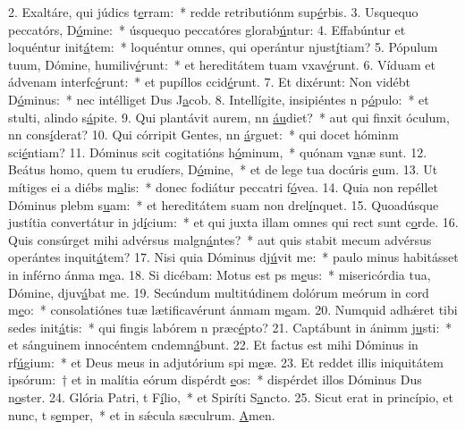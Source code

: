 2. Exaltáre, qui júdics t\uline{e}rram:~* redde retributiónm sup\uline{é}rbis.
3. Usquequo peccatórs, D\uline{ó}mine:~* úsquequo peccatóres glorab\uline{ú}ntur:
4. Effabúntur et loquéntur init\uline{á}tem:~* loquéntur omnes, qui operántur njust\uline{í}tiam?
5. Pópulum tuum, Dómine, humiliv\uline{é}runt:~* et hereditátem tuam vxav\uline{é}runt.
6. Víduam et ádvenam interfc\uline{é}runt:~* et pupíllos ccid\uline{é}runt.
7. Et dixérunt: Non vidébt D\uline{ó}minus:~* nec intélliget Dus J\uline{a}cob.
8. Intellígite, insipiéntes n p\uline{ó}pulo:~* et stulti, alindo s\uline{á}pite.
9. Qui plantávit aurem, nn \uline{áu}diet?~* aut qui finxit óculum, nn cons\uline{í}derat?
10. Qui córripit Gentes, nn \uline{á}rguet:~* qui docet hóminm sci\uline{é}ntiam?
11. Dóminus scit cogitatións h\uline{ó}minum,~* quónam v\uline{a}næ sunt.
12. Beátus homo, quem tu erudíers, D\uline{ó}mine,~* et de lege tua docúris \uline{e}um.
13. Ut mítiges ei a diébs m\uline{a}lis:~* donec fodiátur peccatri f\uline{ó}vea.
14. Quia non repéllet Dóminus plebm s\uline{u}am:~* et hereditátem suam non drel\uline{í}nquet.
15. Quoadúsque justítia convertátur in jd\uline{í}cium:~* et qui juxta illam omnes qui rect sunt c\uline{o}rde.
16. Quis consúrget mihi advérsus malgn\uline{á}ntes?~* aut quis stabit mecum advérsus operántes inquit\uline{á}tem?
17. Nisi quia Dóminus dj\uline{ú}vit me:~* paulo minus habitásset in inférno ánma m\uline{e}a.
18. Si dicébam: Motus est ps m\uline{e}us:~* misericórdia tua, Dómine, djuv\uline{á}bat me.
19. Secúndum multitúdinem dolórum meórum in cord m\uline{e}o:~* consolatiónes tuæ lætificavérunt ánmam m\uline{e}am.
20. Numquid adhǽret tibi sedes init\uline{á}tis:~* qui fingis labórem n præc\uline{é}pto?
21. Captábunt in ánimm j\uline{u}sti:~* et sánguinem innocéntem cndemn\uline{á}bunt.
22. Et factus est mihi Dóminus in rf\uline{ú}gium:~* et Deus meus in adjutórium spi m\uline{e}æ.
23. Et reddet illis iniquitátem ipsórum:~† et in malítia eórum dispérdt \uline{e}os:~* dispérdet illos Dóminus Dus n\uline{o}ster.
24. Glória Patri, t F\uline{í}lio,~* et Spiríti S\uline{a}ncto.
25. Sicut erat in princípio, et nunc, t s\uline{e}mper,~* et in sǽcula sæculrum. \uline{A}men.
